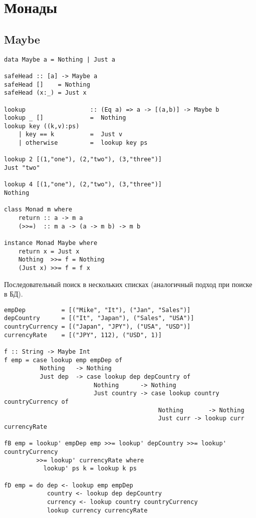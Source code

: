 \documentclass[a4paper,10pt]{article}
\begin{document}
\section{Монады}
\subsection{Maybe}
\begin{lstlisting}
data Maybe a = Nothing | Just a

safeHead :: [a] -> Maybe a
safeHead []    = Nothing
safeHead (x:_) = Just x

lookup                  :: (Eq a) => a -> [(a,b)] -> Maybe b
lookup _ []             =  Nothing
lookup key ((k,v):ps)
    | key == k          =  Just v
    | otherwise         =  lookup key ps

lookup 2 [(1,"one"), (2,"two"), (3,"three")]
Just "two"

lookup 4 [(1,"one"), (2,"two"), (3,"three")]
Nothing

class Monad m where
    return :: a -> m a
    (>>=)  :: m a -> (a -> m b) -> m b

instance Monad Maybe where
    return x = Just x
    Nothing  >>= f = Nothing
    (Just x) >>= f = f x
\end{lstlisting}
\clearpage
Последовательный поиск в нескольких списках (аналогичный подход при поиске в БД).
\begin{lstlisting}
empDep          = [("Mike", "It"), ("Jan", "Sales")]
depCountry      = [("It", "Japan"), ("Sales", "USA")]
countryCurrency = [("Japan", "JPY"), ("USA", "USD")]
currencyRate    = [("JPY", 112), ("USD", 1)]

f :: String -> Maybe Int
f emp = case lookup emp empDep of
          Nothing   -> Nothing
          Just dep  -> case lookup dep depCountry of
                         Nothing      -> Nothing
                         Just country -> case lookup country countryCurrency of
                                           Nothing       -> Nothing
                                           Just curr -> lookup curr currencyRate

fB emp = lookup' empDep emp >>= lookup' depCountry >>= lookup' countryCurrency
         >>= lookup' currencyRate where
           lookup' ps k = lookup k ps

fD emp = do dep <- lookup emp empDep
            country <- lookup dep depCountry
            currency <- lookup country countryCurrency
            lookup currency currencyRate
\end{lstlisting}
\end{document}
